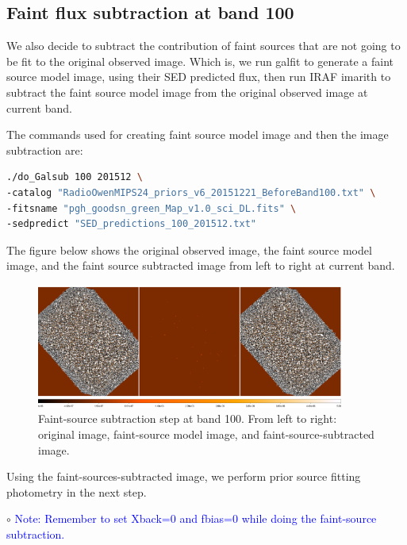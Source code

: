 \documentclass[11pt,a4paper]{article}
\begin{document}
\subsection{Faint flux subtraction at band 100}
\label{Band100_Galsub}


We also decide to subtract the contribution of faint sources that are not going to be fit to the original observed image. Which is, we run galfit to generate a faint source model image, using their SED predicted flux, then run IRAF imarith to subtract the faint source model image from the original observed image at current band. 

The commands used for creating faint source model image and then the image subtraction are:

\begin{lstlisting}[language=bash]
./do_Galsub 100 201512 \
-catalog "RadioOwenMIPS24_priors_v6_20151221_BeforeBand100.txt" \
-fitsname "pgh_goodsn_green_Map_v1.0_sci_DL.fits" \
-sedpredict "SED_predictions_100_201512.txt"
\end{lstlisting}

The figure below shows the original observed image, the faint source model image, and the faint source subtracted image from left to right at current band. 

\begin{figure}[H]
	\caption{Faint-source subtraction step at band 100. From left to right: original image, faint-source model image, and faint-source-subtracted image.}
	\includegraphics[width=0.9\textwidth]{galfit_100_FIT_goodsn_100_Map_201512_Galsub}
\end{figure}

Using the faint-sources-subtracted image, we perform prior source fitting photometry in the next step. 

\indent\hspace{15pt}$\circ$ 
\textcolor{blue}{Note: Remember to set Xback=0 and fbias=0 while doing the faint-source subtraction.}
\\
\end{document}
